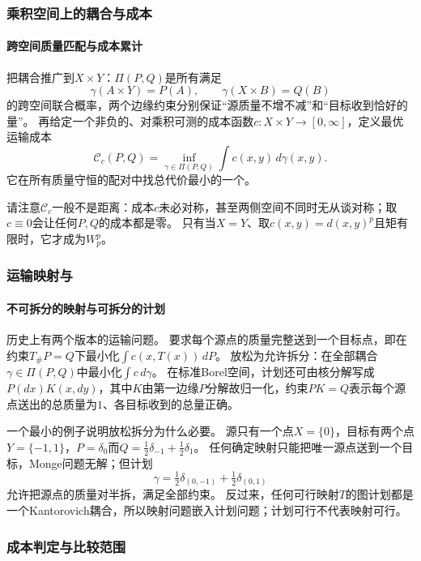 \subsubsection{乘积空间上的耦合与成本}

\paragraph{跨空间质量匹配与成本累计}

把耦合推广到$X\times Y$：$\Pi(P,Q)$是所有满足
\[
 \gamma(A\times Y)=P(A),\qquad \gamma(X\times B)=Q(B)
\]
的跨空间联合概率，两个边缘约束分别保证“源质量不增不减”和“目标收到恰好的量”。
再给定一个非负的、对乘积可测的成本函数$c:X\times Y\to[0,\infty]$，定义最优运输成本
\[
 \mathcal C_c(P,Q)
 =\inf_{\gamma\in\Pi(P,Q)}\int c(x,y)\,d\gamma(x,y).
\]
它在所有质量守恒的配对中找总代价最小的一个。

请注意$\mathcal C_c$一般不是距离：成本$c$未必对称，甚至两侧空间不同时无从谈对称；取$c\equiv0$会让任何$P,Q$的成本都是零。
只有当$X=Y$、取$c(x,y)=d(x,y)^p$且矩有限时，它才成为$W_p^p$。

\subsubsection{运输映射与}

\paragraph{不可拆分的映射与可拆分的计划}

历史上有两个版本的运输问题。
要求每个源点的质量完整送到一个目标点，即在约束$T_\#P=Q$下最小化$\int c(x,T(x))\,dP$。
放松为允许拆分：在全部耦合$\gamma\in\Pi(P,Q)$中最小化$\int c\,d\gamma$。
在标准Borel空间，计划还可由核分解写成$P(dx)K(x,dy)$，其中$K$由第一边缘$P$分解故归一化，约束$PK=Q$表示每个源点送出的总质量为$1$、各目标收到的总量正确。

一个最小的例子说明放松拆分为什么必要。
源只有一个点$X=\{0\}$，目标有两个点$Y=\{-1,1\}$，$P=\delta_0$而$Q=\frac12\delta_{-1}+\frac12\delta_1$。
任何确定映射只能把唯一源点送到一个目标，Monge问题无解；但计划
\[
 \gamma=\tfrac12\delta_{(0,-1)}+\tfrac12\delta_{(0,1)}
\]
允许把源点的质量对半拆，满足全部约束。
反过来，任何可行映射$T$的图计划都是一个Kantorovich耦合，所以映射问题嵌入计划问题；计划可行不代表映射可行。

\subsubsection{成本判定与比较范围}

